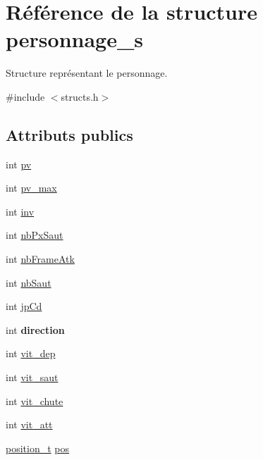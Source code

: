 \hypertarget{structpersonnage__s}{}\section{Référence de la structure personnage\+\_\+s}
\label{structpersonnage__s}


Structure représentant le personnage.  




{\ttfamily \#include $<$structs.\+h$>$}

\subsection*{Attributs publics}
\begin{DoxyCompactItemize}
\item 
int \hyperlink{structpersonnage__s_ab3090d9110756af454516f939e9f8a86}{pv}
\item 
int \hyperlink{structpersonnage__s_a0e58c8761de9044ce770f21aa9ada41a}{pv\+\_\+max}
\item 
int \hyperlink{structpersonnage__s_a1d76a383232b764037a80a8b39b3c378}{inv}
\item 
int \hyperlink{structpersonnage__s_a47e8c34ccb98b49ca57baa55d4326ee3}{nb\+Px\+Saut}
\item 
int \hyperlink{structpersonnage__s_a9dc9cf38290d069f2bfbdfe1b19184ac}{nb\+Frame\+Atk}
\item 
int \hyperlink{structpersonnage__s_a1b5dac574e8ad57eaa9989699fbfb139}{nb\+Saut}
\item 
int \hyperlink{structpersonnage__s_a05d061a818efa6b7bfa5b3c76ba3b8dd}{jp\+Cd}
\item 
\mbox{\label{structpersonnage__s_a6d6791f61e66ee9ee1125c39bc99f164}} 
int {\bfseries direction}
\item 
int \hyperlink{structpersonnage__s_a6899a0efdc3a3fccb060aaf06b4e4b8d}{vit\+\_\+dep}
\item 
int \hyperlink{structpersonnage__s_abf199b160e1ce327b7def1ed1ee00b39}{vit\+\_\+saut}
\item 
int \hyperlink{structpersonnage__s_a8e340f828bfffa2c47269e315609ed01}{vit\+\_\+chute}
\item 
int \hyperlink{structpersonnage__s_a0022973bab638a02774a19710cedcd17}{vit\+\_\+att}
\item 
\hyperlink{structposition__s}{position\+\_\+t} \hyperlink{structpersonnage__s_adea4789f8b55587ec092f3a32b7b1964}{pos}

\end{DoxyCompactItemize}
